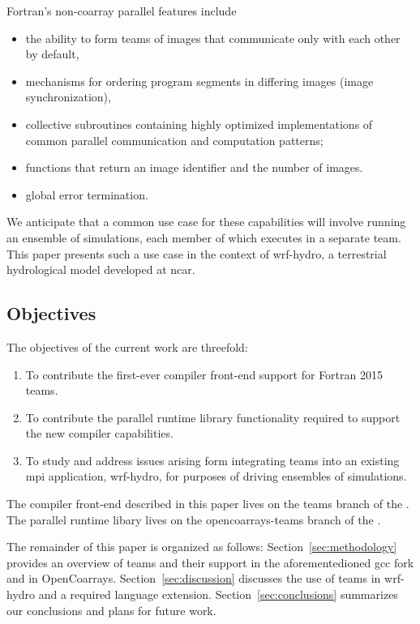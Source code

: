 Fortran's non-\gls{coarray} parallel features include
\begin{itemize}
   \item the ability to form teams of images that communicate only with each other by default,
   \item mechanisms for ordering program segments in differing images (image synchronization),
   \item collective subroutines containing highly optimized implementations of common parallel
         communication and computation patterns;
   \item functions that return an image identifier and the number of images.
   \item global error termination.
\end{itemize}
We anticipate that a common use case for these capabilities will involve running an ensemble of simulations, each member of
which executes in a separate team.  This paper presents such a use case in the context of \gls{wrf-hydro}, a terrestrial
hydrological model developed at \gls{ncar}.


\subsection{Objectives}\label{sec:objectives}
The objectives of the current work are threefold:
\begin{enumerate}
  \item To contribute the first-ever compiler front-end support for Fortran 2015 teams.
  \item To contribute the parallel runtime library functionality required to support the new compiler capabilities.
  \item To study and address issues arising form integrating teams into an existing \gls{mpi} application, \gls{wrf-hydro},
        for purposes of driving ensembles of simulations.
\end{enumerate}
The compiler front-end described in this paper lives on the teams branch of the
. The parallel runtime libary lives on the
opencoarrays-teams branch of the .

The remainder of this paper is organized as follows: Section~\ref{sec:methodology} provides an overview of teams and their
support in the aforementedioned \gls{gcc} fork and in OpenCoarrays.  Section~\ref{sec:discussion} discusses the use of teams
in \gls{wrf-hydro} and a required language extension. Section~\ref{sec:conclusions} summarizes our conclusions and plans for
future work.

